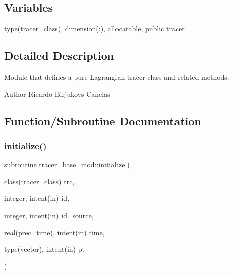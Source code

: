 \subsection*{Variables}
\begin{DoxyCompactItemize}
\item 
type(\hyperlink{structtracer__base__mod_1_1tracer__class}{tracer\+\_\+class}), dimension(\+:), allocatable, public \hyperlink{namespacetracer__base__mod_a8e683639ef8cd4f4bdcff33fffe21fc2}{tracer}
\end{DoxyCompactItemize}


\subsection{Detailed Description}
Module that defines a pure Lagrangian tracer class and related methods. 

\begin{DoxyAuthor}{Author}
Ricardo Birjukovs Canelas 
\end{DoxyAuthor}


\subsection{Function/\+Subroutine Documentation}
\mbox{\label{namespacetracer__base__mod_ae73e3d1fd8818cf3e1a8593aafebea43}} 
\subsubsection{\texorpdfstring{initialize()}{initialize()}}
{\footnotesize\ttfamily subroutine tracer\+\_\+base\+\_\+mod\+::initialize (\begin{DoxyParamCaption}\item[{class(\hyperlink{structtracer__base__mod_1_1tracer__class}{tracer\+\_\+class})}]{trc,  }\item[{integer, intent(in)}]{id,  }\item[{integer, intent(in)}]{id\+\_\+source,  }\item[{real(prec\+\_\+time), intent(in)}]{time,  }\item[{type(vector), intent(in)}]{pt }\end{DoxyParamCaption})\hspace{0.3cm}{\ttfamily [private]}}



